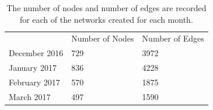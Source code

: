 \documentclass[twoside,twocolumn]{article}
\begin{document}
\begin{table}[]
\centering
\caption{The number of nodes and number of edges are recorded for each of the networks created for each month.}
\label{table1}
\begin{tabular}{lll}
                                   & Number of Nodes          & Number of Edges           \\ \cline{2-3} 
\multicolumn{1}{l|}{December 2016} & \multicolumn{1}{l|}{729} & \multicolumn{1}{l|}{3972} \\ \cline{2-3} 
\multicolumn{1}{l|}{January 2017}  & \multicolumn{1}{l|}{836} & \multicolumn{1}{l|}{4228} \\ \cline{2-3} 
\multicolumn{1}{l|}{February 2017} & \multicolumn{1}{l|}{570} & \multicolumn{1}{l|}{1875} \\ \cline{2-3} 
\multicolumn{1}{l|}{March 2017}    & \multicolumn{1}{l|}{497} & \multicolumn{1}{l|}{1590} \\ \cline{2-3} 
\end{tabular}
\end{table}
\end{document}
